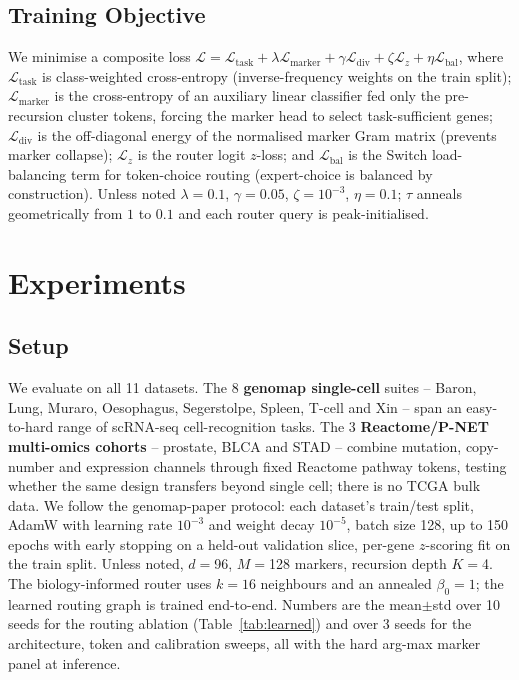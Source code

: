 \documentclass[letterpaper]{article}
\begin{document}
\subsection{Training Objective}
We minimise a composite loss
$\mathcal{L} = \mathcal{L}_{\mathrm{task}} + \lambda\mathcal{L}_{\mathrm{marker}}
+ \gamma\mathcal{L}_{\mathrm{div}} + \zeta\mathcal{L}_{z} + \eta\mathcal{L}_{\mathrm{bal}}$,
where $\mathcal{L}_{\mathrm{task}}$ is class-weighted cross-entropy (inverse-frequency
weights on the train split); $\mathcal{L}_{\mathrm{marker}}$ is the cross-entropy of
an auxiliary linear classifier fed only the pre-recursion cluster tokens, forcing the
marker head to select task-sufficient genes;
$\mathcal{L}_{\mathrm{div}}$ is the off-diagonal energy of the normalised marker Gram
matrix (prevents marker collapse); $\mathcal{L}_{z}$ is the router logit $z$-loss; and
$\mathcal{L}_{\mathrm{bal}}$ is the Switch load-balancing term
\cite{shazeer2017outrageously} for token-choice routing (expert-choice is balanced by
construction). Unless noted $\lambda{=}0.1$, $\gamma{=}0.05$, $\zeta{=}10^{-3}$,
$\eta{=}0.1$; $\tau$ anneals geometrically from $1$ to $0.1$ and each router query is
peak-initialised.

\section{Experiments}
\subsection{Setup}
We evaluate on all 11 datasets. The $8$ \textbf{genomap single-cell}
suites \cite{islam2023cartography} -- Baron, Lung, Muraro, Oesophagus, Segerstolpe,
Spleen, T-cell and Xin -- span an easy-to-hard range of scRNA-seq cell-recognition
tasks. The $3$ \textbf{Reactome/P-NET multi-omics cohorts} -- prostate, BLCA and
STAD -- combine mutation, copy-number and expression channels through fixed Reactome
pathway tokens, testing whether the same design transfers beyond single cell; there is no
TCGA bulk data. We follow the genomap-paper protocol: each dataset's train/test split,
AdamW with learning rate $10^{-3}$ and weight decay $10^{-5}$, batch size 128, up to
150 epochs with early stopping on a held-out validation slice, per-gene
$z$-scoring fit on the train split. Unless noted, $d{=}$96,
$M{=}$128 markers, recursion depth $K{=}$4. The biology-informed router
uses $k{=}16$ neighbours and an annealed $\beta_0{=}1$; the learned routing graph is
trained end-to-end. Numbers are the mean$\pm$std over 10 seeds for the
routing ablation (Table~\ref{tab:learned}) and over 3 seeds for the architecture,
token and calibration sweeps, all with the hard arg-max marker panel at inference.
\end{document}

